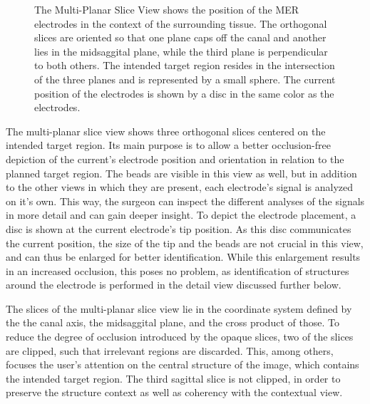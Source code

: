 \documentclass{vgtc}                          %
\begin{document}
\begin{figure}[t]
    \centering
    \caption{The Multi-Planar Slice View shows the position of the MER electrodes in the context of the surrounding tissue. The orthogonal slices are oriented so that one plane caps off the canal and another lies in the midsaggital plane, while the third plane is perpendicular to both others. The intended target region resides in the intersection of the three planes and is represented by a small sphere. The current position of the electrodes is shown by a disc in the same color as the electrodes.}
    \label{fig:recordingphase:mpr}
\end{figure}

The multi-planar slice view shows three orthogonal slices centered on the intended target region. Its main purpose is to allow a better occlusion-free depiction of the current's electrode position and orientation in relation to the planned target region. The beads are visible in this view as well, but in addition to the other views in which they are present, each electrode's signal is analyzed on it's own. This way, the surgeon can inspect the different analyses of the signals in more detail and can gain deeper insight. To depict the electrode placement, a disc is shown at the current electrode's tip position. As this disc communicates the current position, the size of the tip and the beads are not crucial in this view, and can thus be enlarged for better identification. While this enlargement results in an increased occlusion, this poses no problem, as identification of structures around the electrode is performed in the detail view discussed further below.

The slices of the multi-planar slice view lie in the coordinate system defined by the the canal axis, the midsaggital plane, and the cross product of those. To reduce the degree of occlusion introduced by the opaque slices, two of the slices are clipped, such that irrelevant regions are discarded. This, among others, focuses the user's attention on the central structure of the image, which contains the intended target region. The third sagittal slice is not clipped, in order to preserve the structure context as well as coherency with the contextual view.
\end{document}
